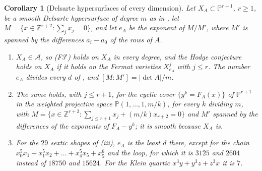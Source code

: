 \documentclass[11pt,reqno]{amsart}
\theoremstyle{plain}
\newtheorem{corollary}[theorem]{Corollary}
\theoremstyle{definition}
\theoremstyle{remark}
\newcommand{\ZZ}{\mathbb{Z}}
\newcommand{\PP}{\mathbb{P}}
\begin{document}
\begin{corollary}[Delsarte hypersurfaces of every dimension]
\label{cor:delsarteall}
Let $X_{A}\subset\PP^{r+1}$, $r\ge1$, be a smooth Delsarte hypersurface of
degree $m$ as in , let $M=\{x\in\ZZ^{r+2}:\sum_{j}x_{j}=0\}$,
and let $e_{A}$ be the exponent of $M/M'$, where $M'$ is spanned by the
differences $a_{i}-a_{0}$ of the rows of $A$.
\begin{enumerate}[label=\textup{(\roman*)},leftmargin=2.6em,itemsep=2pt]
\item $X_{A}\in\mathcal{A}$, so \textup{(F3$'$)} holds on $X_{A}$ in every
  degree, and the Hodge conjecture holds on $X_{A}$ if it holds on the Fermat
  varieties $X^{j}_{e_{A}}$ with $j\le r$. The number $e_{A}$ divides every
  $d$ of , and $[M:M']=|\det A|/m$.
\item The same holds, with $j\le r+1$, for the cyclic cover
  $\{y^{k}=F_{A}(x)\}$ of $\PP^{r+1}$ in the weighted projective space
  $\PP(1,\dots,1,m/k)$, for every $k$ dividing $m$, with
  $M=\{x\in\ZZ^{r+3}:\sum_{j\le r+1}x_{j}+(m/k)x_{r+2}=0\}$ and $M'$ spanned
  by the differences of the exponents of $F_{A}-y^{k}$; it is smooth
  because $X_{A}$ is.
\item For the $29$ sextic shapes of (iii), $e_{A}$ is the
  least $d$ there, except for the chain $x_{0}^{5}x_{1}+x_{1}^{5}x_{2}+\dots
  +x_{4}^{5}x_{5}+x_{5}^{6}$ and the loop, for which it is $3125$ and $2604$
  instead of $18750$ and $15624$. For the Klein quartic
  $x^{3}y+y^{3}z+z^{3}x$ it is $7$.
\end{enumerate}
\end{corollary}
\end{document}
